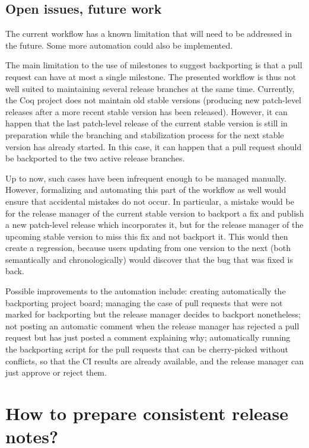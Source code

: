 \subsection{Open issues, future work}

\label{sec:open-issues-backport}

The current workflow has a known limitation that will need to be addressed in the future.
Some more automation could also be implemented.

The main limitation to the use of milestones to suggest backporting is that a pull request can have at most a single milestone.
The presented workflow is thus not well suited to maintaining several release branches at the same time.
Currently, the Coq project does not maintain old stable versions (producing new patch-level releases after a more recent stable version has been released).
However, it can happen that the last patch-level release of the current stable version is still in preparation while the branching and stabilization process for the next stable version has already started.
In this case, it can happen that a pull request should be backported to the two active release branches.

Up to now, such cases have been infrequent enough to be managed manually.
However, formalizing and automating this part of the workflow as well would ensure that accidental mistakes do not occur.
In particular, a mistake would be for the release manager of the current stable version to backport a fix and publish a new patch-level release which incorporates it, but for the release manager of the upcoming stable version to miss this fix and not backport it.
This would then create a regression, because users updating from one version to the next (both semantically and chronologically) would discover that the bug that was fixed is back.

Possible improvements to the automation include: creating automatically the backporting project board; managing the case of pull requests that were not marked for backporting but the release manager decides to backport nonetheless; not posting an automatic comment when the release manager has rejected a pull request but has just posted a comment explaining why; automatically running the backporting script for the pull requests that can be cherry-picked without conflicts, so that the CI results are already available, and the release manager can just approve or reject them.

\section{How to prepare consistent release notes?}

